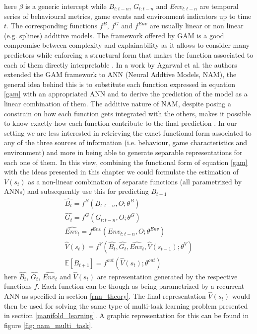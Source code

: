 here $\beta$ is a generic intercept while $B_{t:t-n}$, $G_{t:t-n}$ and $Env_{t:t-n}$ are temporal series of behavioural metrics, game events and environment indicators up to time $t$. The corresponding functions $f^{B}$, $f^{G}$ and $f^{Env}$ are usually linear or non linear (e.g. splines) additive models. The framework offered by GAM is a good compromise between complexity and explainability as it allows to consider many predictors while enforcing a structural form that makes the function associated to each of them directly interpretable \cite{hastie2017generalized}. In a work by Agarwal et al. \cite{agarwal2021neural} the authors extended the GAM framework to ANN (Neural Addtive Models, NAM), the general idea behind this is to substitute each function expressed in equation \ref{gam} with an appropriated ANN and to derive the prediction of the model as a linear combination of them. The additive nature of NAM, despite posing a constrain on how each function gets integrated with the others, makes it possible to know exactly how each function contribute to the final prediction \cite{hastie2017generalized,agarwal2017quitting}. In our setting we are less interested in retrieving the exact functional form associated to any of the three sources of information (i.e. behaviour, game characteristics and environment) and more in being able to generate separable representations for each one of them. In this view, combining the functional form of equation \ref{gam} with the ideas presented in this chapter we could formulate the estimation of $V(s_t)$ as a non-linear combination of separate functions (all parametrized by ANNs) and subsequently use this for predicting $B_{t+1}$
\begin{gather}
\label{nam}
    \widehat{B_t} = f^{B}(B_{t:t-n}, O;\theta^{B}) \\ \nonumber
    \widehat{G_t} = f^{G}(G_{t:t-n}, O;\theta^{G}) \\ \nonumber
    \widehat{Env_t} = f^{Env}(Env_{t:t-n}, O;\theta^{Env}) \\ \nonumber
    \widehat{V}(s_t) = f^{V}(\widehat{B_t}, \widehat{G_t}, \widehat{Env_t}, \widehat{V}(s_{t-1}); \theta^{V}) \\ \nonumber
    \mathbb{E}[{B}_{t+1}] = f^{out}(\widehat{V}(s_t); \theta^{out})
\end{gather}
here $\widehat{B_t}$, $\widehat{G_t}$, $\widehat{Env_t}$ and $\widehat{V}(s_t)$ are representation generated by the respective functions $f$. Each function can be though as being parametrized by a recurrent ANN as specified in section \ref{rnn_theory}. The final representation $\widehat{V}(s_t)$ would then be used for solving the same type of multi-task learning problem presented in section \ref{manifold_learning}. A graphic representation for this can be found in figure \ref{fig: nam_multi_task}.



